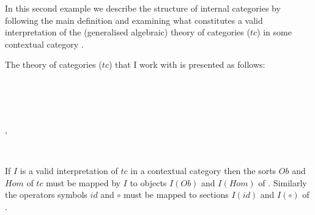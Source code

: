 \newcommand{\assocequivalentlhs}{\tuple{\dddot z_1,\dddot z_3,\dddot z_4,\tuple{\dddot z_1,\dddot z_2,\dddot z_3,f,g}\circ \compmorph,h} \circ \compmorph}
\newcommand{\assocequivalentrhs}{\tuple{\dddot z_1,\dddot z_2,\dddot z_4,f,\tuple{\dddot z_1,\dddot z_2,\dddot z_3,g,h}\circ \compmorph} \circ \compmorph}

\newcommand{\compmorph}{\text{`$\circ$\kern-2pt'}}%

\newcommand{\ccplaceholder}{\rule[-0.2cm]{0cm}{0.6cm}\kern0.2cm}
\newcommand{\rightend}[1] { \kern-0.2cm\Rnode{#1} {\ccplaceholder} }

\note
In this second example we describe the structure of internal categories by following the main definition and examining
what constitutes a valid interpretation of the (generalised algebraic) theory of categories ($tc$) in some 
 contextual category \catc.

\note The theory of categories ($tc$) that I work with is presented as follows:
\begin{gatrules}
\gatintros
{}
 \\
   \\	
   \\	
\gataxioms
{}
\begin{gatgroup}{,\ }
     \\
\end{gatgroup} \\
\end{gatrules}

\note If $I$ is a valid interpretation of $tc$ in a contextual category \catc then the sorts $Ob$ and $Hom$ of $tc$ 
must be mapped by $I$  to objects $I(Ob)$ and  $I(Hom)$ of \catc.
Similarly  the operators symbols
$id$ and $\circ$ must be mapped to sections $I(id)$ and $I(\circ)$ of \catc.


